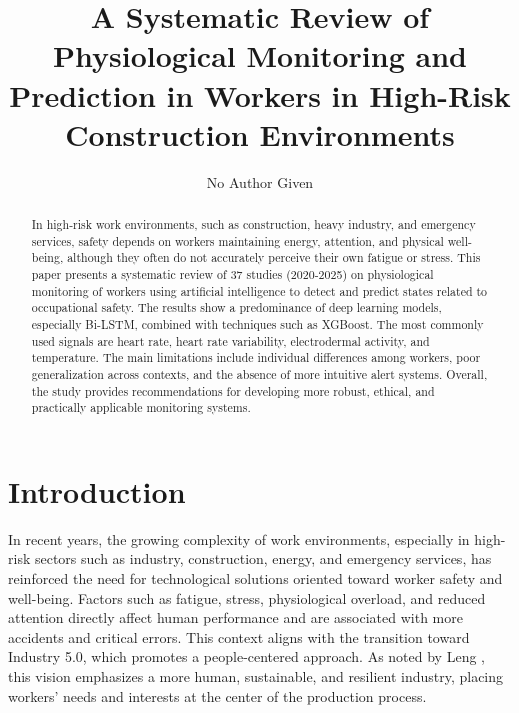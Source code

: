 \documentclass[runningheads]{llncs}
\begin{document}
%
\title{A Systematic Review of Physiological Monitoring and Prediction in Workers in High-Risk Construction Environments}
%
%
\author{No Author Given}
%
%
%
\maketitle              %
%
\begin{abstract}

In high-risk work environments, such as construction, heavy industry, and emergency services, safety depends on workers maintaining energy, attention, and physical well-being, although they often do not accurately perceive their own fatigue or stress. This paper presents a systematic review of 37 studies (2020-2025) on physiological monitoring of workers using artificial intelligence to detect and predict states related to occupational safety. The results show a predominance of deep learning models, especially Bi-LSTM, combined with techniques such as XGBoost. The most commonly used signals are heart rate, heart rate variability, electrodermal activity, and temperature. The main limitations include individual differences among workers, poor generalization across contexts, and the absence of more intuitive alert systems. Overall, the study provides recommendations for developing more robust, ethical, and practically applicable monitoring systems.

\end{abstract}
%
%
%
\section{Introduction}

In recent years, the growing complexity of work environments, especially in high-risk sectors such as industry, construction, energy, and emergency services, has reinforced the need for technological solutions oriented toward worker safety and well-being. Factors such as fatigue, stress, physiological overload, and reduced attention directly affect human performance and are associated with more accidents and critical errors. This context aligns with the transition toward Industry 5.0, which promotes a people-centered approach. As noted by Leng \cite{leng2024}, this vision emphasizes a more human, sustainable, and resilient industry, placing workers' needs and interests at the center of the production process.
\end{document}

